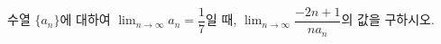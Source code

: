 수열 $\{a_n\}$에 대하여 $\displaystyle\lim_{n\to\infty}a_n=\dfrac{1}{7}$일 때, $\displaystyle\lim_{n\to\infty}\dfrac{-2n+1}{na_n}$의 값을 구하시오.
